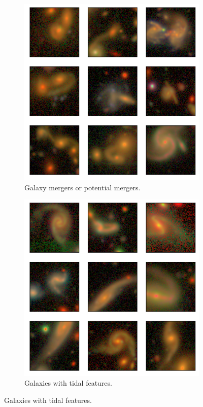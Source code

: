 \begin{figure}
\begin{subfigure}{.45\textwidth}
  \centering
  \includegraphics[width=0.8\linewidth]{anomalies_mergers}
  \caption{Galaxy mergers or potential mergers.}
  \label{fig:anom_mergers}
\end{subfigure}
\hspace{2em}
\begin{subfigure}{.45\textwidth}
  \centering
  \includegraphics[width=0.8\linewidth]{anomalies_tidal}  
  \caption{Galaxies with tidal features.}
  \label{fig:anom_tidal}
\end{subfigure}


\end{figure}
